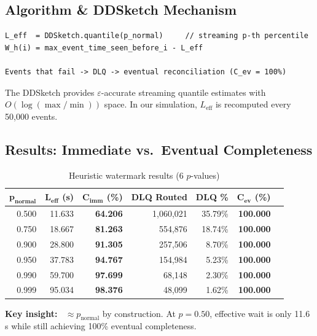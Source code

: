 \documentclass[11pt,a4paper]{article}
\DeclareMathOperator{\Cimm}{C_{\text{imm}}}
\newcommand{\Leff}{L_{\text{eff}}}
\begin{document}
\subsection{Algorithm \& DDSketch Mechanism}

\begin{lstlisting}[caption={Heuristic watermark algorithm}, label={lst:heuristic}]
L_eff  = DDSketch.quantile(p_normal)     // streaming p-th percentile
W_h(i) = max_event_time_seen_before_i - L_eff

Events that fail -> DLQ -> eventual reconciliation (C_ev = 100%)
\end{lstlisting}

The DDSketch \cite{masson2019} provides $\varepsilon$-accurate streaming quantile estimates with $O(\log(\max/\min))$ space.
In our simulation, $\Leff$ is recomputed every 50,000 events.

\subsection{Results: Immediate vs.\ Eventual Completeness}

\begin{table}[H]
\centering
\caption{Heuristic watermark results (6 $p$-values)}
\label{tab:heuristic-results}
\begin{tabular}{rrrrrrr}
\toprule
$\bm{p_{\textbf{normal}}}$ & $\mathbf{L_{\textbf{eff}}}$ \textbf{(s)} & $\mathbf{C_{\textbf{imm}}}$ \textbf{(\%)} & \textbf{DLQ Routed} & \textbf{DLQ \%} & $\mathbf{C_{\textbf{ev}}}$ \textbf{(\%)} \\
\midrule
0.500 & 11.633 & \textbf{64.206} & 1,060,021 & 35.79\% & \textbf{100.000} \\
0.750 & 18.667 & \textbf{81.263} & 554,876   & 18.74\% & \textbf{100.000} \\
0.900 & 28.800 & \textbf{91.305} & 257,506   & 8.70\%  & \textbf{100.000} \\
0.950 & 37.783 & \textbf{94.767} & 154,984   & 5.23\%  & \textbf{100.000} \\
0.990 & 59.700 & \textbf{97.699} & 68,148    & 2.30\%  & \textbf{100.000} \\
0.999 & 95.034 & \textbf{98.376} & 48,099    & 1.62\%  & \textbf{100.000} \\
\bottomrule
\end{tabular}
\end{table}

\textbf{Key insight:} $\Cimm \approx p_{\text{normal}}$ by construction.
At $p{=}0.50$, effective wait is only 11.6\,s while still achieving 100\% eventual completeness.
\end{document}
